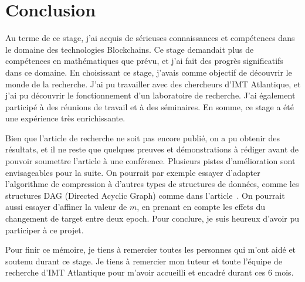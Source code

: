 \chapter{Conclusion}\label{chap:Conclusion}

    Au terme de ce stage, j'ai acquis de sérieuses connaissances et compétences
    dans le domaine des technologies Blockchains. Ce stage demandait plus de
    compétences en mathématiques que prévu, et j'ai fait des progrès
    significatifs dans ce domaine. En choisissant ce stage, j'avais comme
    objectif de découvrir le monde de la recherche. J'ai pu travailler avec des
    chercheurs d'IMT Atlantique, et j'ai pu découvrir le fonctionnement d'un
    laboratoire de recherche. J'ai également participé à des réunions de travail
    et à des séminaires. En somme, ce stage a été une expérience très
    enrichissante.

    Bien que l'article de recherche ne soit pas encore publié, on a pu obtenir
    des résultats, et il ne reste que quelques preuves et démonstrations à
    rédiger avant de pouvoir soumettre l'article à une conférence.    
    Plusieurs pistes d'amélioration sont envisageables pour la suite. On
    pourrait par exemple essayer d'adapter l'algorithme de compression à
    d'autres types de structures de données, comme les structures DAG (Directed
    Acyclic Graph) comme dans l'article~\cite{dag}. On pourrait aussi essayer
    d'affiner la valeur de $m$, en prenant en compte les effets du changement de
    target entre deux epoch. Pour conclure, je suis heureux d'avoir pu
    participer à ce projet.

    Pour finir ce mémoire, je tiens à remercier toutes les personnes qui m'ont
    aidé et soutenu durant ce stage. Je tiens à remercier mon tuteur et toute
    l'équipe de recherche d'IMT Atlantique pour m'avoir accueilli et encadré
    durant ces 6 mois.